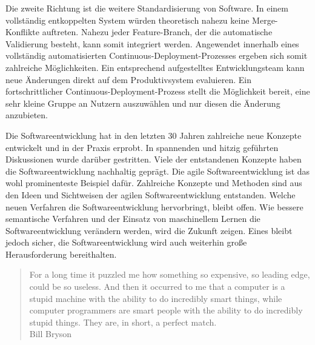 Die zweite Richtung ist die weitere Standardisierung von Software. In einem vollständig entkoppelten System würden theoretisch nahezu keine Merge-Konflikte auftreten. Nahezu jeder Feature-Branch, der die automatische Validierung besteht, kann somit integriert werden. Angewendet innerhalb eines vollständig automatisierten Continuous-Deployment-Prozesses ergeben sich somit zahlreiche Möglichkeiten. Ein entsprechend aufgestelltes Entwicklungsteam kann neue Änderungen direkt auf dem Produktivsystem evaluieren. Ein fortschrittlicher Continuous-Deployment-Prozess stellt die Möglichkeit bereit, eine sehr kleine Gruppe an Nutzern auszuwählen und nur diesen die Änderung anzubieten.

Die Softwareentwicklung hat in den letzten 30 Jahren zahlreiche neue Konzepte entwickelt und in der Praxis erprobt. In spannenden und hitzig geführten Diskussionen wurde darüber gestritten. Viele der entstandenen Konzepte haben die Softwareentwicklung nachhaltig geprägt. Die agile Softwareentwicklung ist das wohl prominenteste Beispiel dafür. Zahlreiche Konzepte und Methoden sind aus den Ideen und Sichtweisen der agilen Softwareentwicklung entstanden. Welche neuen Verfahren die Softwareentwicklung hervorbringt, bleibt offen. Wie bessere semantische Verfahren und der Einsatz von maschinellem Lernen die Softwareentwicklung verändern werden, wird die Zukunft zeigen. Eines bleibt jedoch sicher, die Softwareentwicklung wird auch weiterhin große Herausforderung bereithalten.

\blockquote {\centering For a long time it puzzled me how something so expensive, so leading edge, could be so useless. And then it occurred to me that a computer is a stupid machine with the ability to do incredibly smart things, while computer programmers are smart people with the ability to do incredibly stupid things. They are, in short, a perfect match. \\ Bill Bryson}
